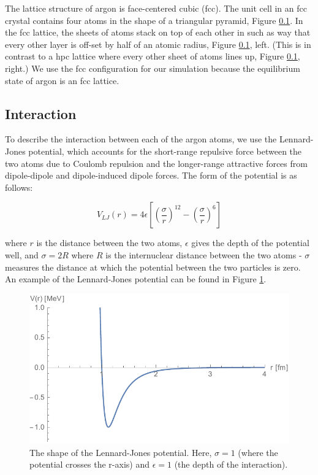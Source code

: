 \documentclass{article}
\begin{document}
\begin{multicols}{2}
The lattice structure of argon is face-centered cubic (fcc).  The unit cell in an fcc crystal contains four atoms in the shape of a triangular pyramid, Figure \ref{}.  In the fcc lattice, the sheets of atoms stack on top of each other in such as way that every other layer is off-set by half of an atomic radius, Figure \ref{}, left.  (This is in contrast to a hpc lattice where every other sheet of atoms lines up, Figure \ref{}, right.)  We use the fcc configuration for our simulation because the equilibrium state of argon is an fcc lattice.  

\subsection{Interaction}

To describe the interaction between each of the argon atoms, we use the Lennard-Jones potential, which accounts for the short-range repulsive force between the two atoms due to Coulomb repulsion and the longer-range attractive forces from dipole-dipole and dipole-induced dipole forces.  The form of the potential is as follows:

\begin{equation}
\label{LJpot}
V_{LJ}(r) = 4 \epsilon \left [ \left (\frac{\sigma}{r} \right )^{12} - \left (\frac{\sigma}{r} \right )^{6} \right ]
\end{equation}

\noindent where $r$ is the distance between the two atoms, $\epsilon$ gives the depth of the potential well, and $\sigma = 2R $ where $R$ is the internuclear distance between the two atoms - $\sigma$ measures the distance at which the potential between the two particles is zero.  An example of the Lennard-Jones potential can be found in Figure \ref{VLJfig}.

\begin{figure}[H]
\begin{center}
\includegraphics[width=\linewidth]{VLJ.pdf}
\caption{The shape of the Lennard-Jones potential.  Here, $\sigma=1$ (where the potential crosses the r-axis) and $\epsilon =1$ (the depth of the interaction).}
\label{VLJfig}
\end{center}
\end{figure}


\end{multicols}
\end{document}
